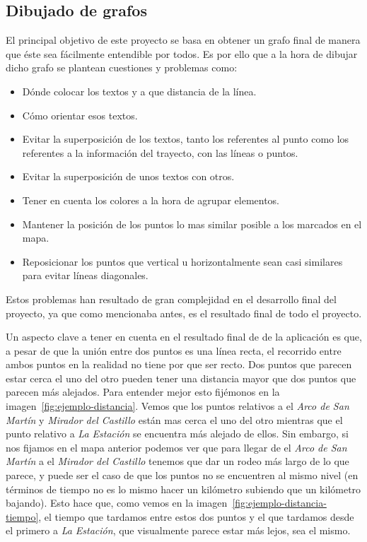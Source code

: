 \subsection{Dibujado de grafos}
El principal objetivo de este proyecto se basa en obtener un grafo final de manera que éste sea fácilmente entendible por todos. Es por ello que a la hora de dibujar dicho grafo se plantean cuestiones y problemas como:
\begin{itemize}
	\item Dónde colocar los textos y a que distancia de la línea.
	\item Cómo orientar esos textos.
	\item Evitar la superposición de los textos, tanto los referentes al punto como los referentes a la información del trayecto, con las líneas o puntos.
	\item Evitar la superposición de unos textos con otros.
	\item Tener en cuenta los colores a la hora de agrupar elementos.
	\item Mantener la posición de los puntos lo mas similar posible a los marcados en el mapa.
	\item Reposicionar los puntos que vertical u horizontalmente sean casi similares para evitar líneas diagonales.
\end{itemize}

Estos problemas han resultado de gran complejidad en el desarrollo final del proyecto, ya que como mencionaba antes, es el resultado final de todo el proyecto.

Un aspecto clave a tener en cuenta en el resultado final de de la aplicación es que, a pesar de que la unión entre dos puntos es una línea recta, el recorrido entre ambos puntos en la realidad no tiene por que ser recto. Dos puntos que parecen estar cerca el uno del otro pueden tener una distancia mayor que dos puntos que parecen más alejados. Para entender mejor esto fijémonos en la imagen~\ref{fig:ejemplo-distancia}. Vemos que los puntos relativos a el \textit{Arco de San Martín} y \textit{Mirador del Castillo} están mas cerca el uno del otro mientras que el punto relativo a \textit{La Estación} se encuentra más alejado de ellos.
Sin embargo, si nos fijamos en el mapa anterior podemos ver que para llegar de el \textit{Arco de San Martín} a el \textit{Mirador del Castillo} tenemos que dar un rodeo más largo de lo que parece, y puede ser el caso de que los puntos no se encuentren al mismo nivel (en términos de tiempo no es lo mismo hacer un kilómetro subiendo que un kilómetro bajando). Esto hace que, como vemos en la imagen~\ref{fig:ejemplo-distancia-tiempo}, el tiempo que tardamos entre estos dos puntos y el que tardamos desde el primero a \textit{La Estación}, que visualmente parece estar más lejos, sea el mismo.

